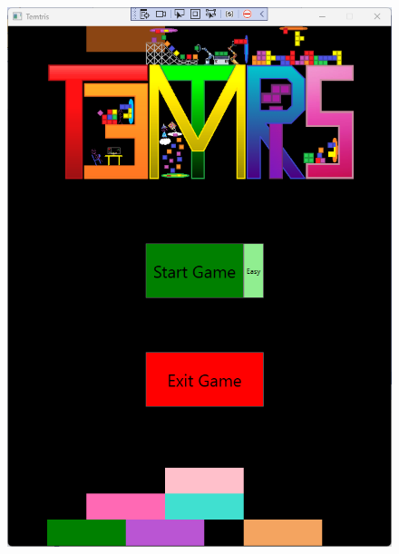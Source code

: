 \documentclass[10pt,conference,onecolumn,compsoc]{IEEEtran}
\begin{document}
\begin{figure}[!h]
\centering
\includegraphics[scale=0.3]{Temtris_Menu.png}

\end{figure}
\end{document}
